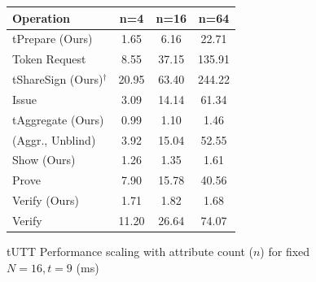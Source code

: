 \begin{figure}[!htb]
    \centering
    \begin{minipage}[t]{0.48\textwidth}
        \centering
        
        \vspace{0.5em}
        \scriptsize
        \begin{tabular}{lccc}
        \toprule
        \textbf{Operation} & \textbf{n=4} & \textbf{n=16} & \textbf{n=64} \\
        \midrule
        tPrepare (Ours) & 1.65 & 6.16 & 22.71 \\
        Token Request & 8.55 & 37.15 & 135.91 \\
        \midrule
        tShareSign (Ours)$^{\dagger}$ & 20.95 & 63.40 & 244.22 \\
        Issue & 3.09 & 14.14 & 61.34 \\
        \midrule
        tAggregate (Ours) & 0.99 & 1.10 & 1.46 \\
        (Aggr., Unblind) & 3.92 & 15.04 & 52.55 \\
        \midrule
        Show (Ours) & 1.26 & 1.35 & 1.61 \\
        Prove & 7.90 & 15.78 & 40.56 \\
        \midrule
        Verify (Ours) & 1.71 & 1.82 & 1.68 \\
        Verify & 11.20 & 26.64 & 74.07 \\
        \bottomrule
        \end{tabular}
        \caption{tUTT Performance scaling with attribute count ($n$) for fixed $N=16, t=9$ (ms)}
        \label{tab:chap5_n_scaling_combined_utt_act}
    \end{minipage}
    \hfill
    \begin{minipage}[t]{0.48\textwidth}
        \centering
        

\end{minipage}
\end{figure}
